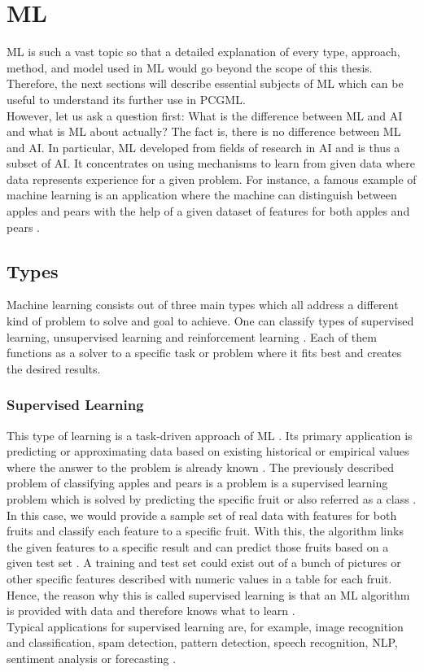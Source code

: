 \documentclass[MGS,Master,english]{twbook}%
\begin{document}
\chapter{\acl{ML}} \label{chapter::machineLearning}
\ac{ML} is such a vast topic so that a detailed explanation of every type, approach, method, and model used in ML would go beyond the scope of this thesis. Therefore, the next sections will describe essential subjects of ML which can be useful to understand its further use in PCGML. \\
However, let us ask a question first: What is the difference between ML and AI and what is ML about actually? The fact is, there is no difference between ML and AI. In particular, ML developed from fields of research in AI and is thus a subset of AI. It concentrates on using mechanisms to learn from given data where data represents experience for a given problem. For instance, a famous example of machine learning is an application where the machine can distinguish between apples and pears with the help of a given dataset of features for both apples and pears \cite{ai::book}. 

\section{Types}
Machine learning consists out of three main types which all address a different kind of problem to solve and goal to achieve. One can classify types of supervised learning, unsupervised learning and reinforcement learning \cite{ml::book::developer}. Each of them functions as a solver to a specific task or problem where it fits best and creates the desired results.

\subsection{Supervised Learning}
This type of learning is a task-driven approach of ML \cite{ml::book::developer}. Its primary application is predicting or approximating data based on existing historical or empirical values where the answer to the problem is already known \cite{ai::book}. The previously described problem of classifying apples and pears is a problem is a supervised learning problem which is solved by predicting the specific fruit or also referred as a class \cite{ml::book::developer}. In this case, we would provide a sample set of real data with features for both fruits and classify each feature to a specific fruit. With this, the algorithm links the given features to a specific result and can predict those fruits based on a given test set \cite{ml::book::developer}. A training and test set could exist out of a bunch of pictures or other specific features described with numeric values in a table for each fruit. Hence, the reason why this is called supervised learning is that an ML algorithm is provided with data and therefore knows what to learn \cite{ai::book}.\\
Typical applications for supervised learning are, for example, image recognition and classification, spam detection, pattern detection, speech recognition, \ac{NLP}, sentiment analysis or forecasting \cite{ml::book::algorithms}.
\end{document}
